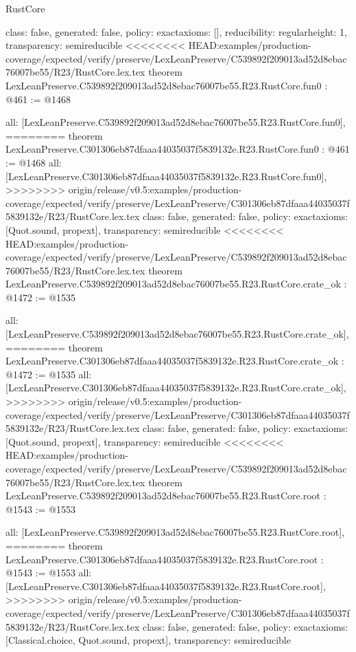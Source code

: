 \begin{lexlean}{RustCore}
\begin{coremodule}
{\begin{coremodule}
{{{  class: false,
  generated: false,
  policy: exact{axioms: []},
  reducibility: regular{height: 1},
  transparency: semireducible
}
<<<<<<<< HEAD:examples/production-coverage/expected/verify/preserve/LexLeanPreserve/C539892f209013ad52d8ebac76007be55/R23/RustCore.lex.tex
theorem LexLeanPreserve.C539892f209013ad52d8ebac76007be55.R23.RustCore.fun0 : @461 := @1468 {
  all: [LexLeanPreserve.C539892f209013ad52d8ebac76007be55.R23.RustCore.fun0],
========
theorem LexLeanPreserve.C301306eb87dfaaa44035037f5839132e.R23.RustCore.fun0 : @461 := @1468 {
  all: [LexLeanPreserve.C301306eb87dfaaa44035037f5839132e.R23.RustCore.fun0],
>>>>>>>> origin/release/v0.5:examples/production-coverage/expected/verify/preserve/LexLeanPreserve/C301306eb87dfaaa44035037f5839132e/R23/RustCore.lex.tex
  class: false,
  generated: false,
  policy: exact{axioms: [Quot.sound, propext]},
  transparency: semireducible
}
<<<<<<<< HEAD:examples/production-coverage/expected/verify/preserve/LexLeanPreserve/C539892f209013ad52d8ebac76007be55/R23/RustCore.lex.tex
theorem LexLeanPreserve.C539892f209013ad52d8ebac76007be55.R23.RustCore.crate_ok : @1472 := @1535 {
  all: [LexLeanPreserve.C539892f209013ad52d8ebac76007be55.R23.RustCore.crate_ok],
========
theorem LexLeanPreserve.C301306eb87dfaaa44035037f5839132e.R23.RustCore.crate_ok : @1472 := @1535 {
  all: [LexLeanPreserve.C301306eb87dfaaa44035037f5839132e.R23.RustCore.crate_ok],
>>>>>>>> origin/release/v0.5:examples/production-coverage/expected/verify/preserve/LexLeanPreserve/C301306eb87dfaaa44035037f5839132e/R23/RustCore.lex.tex
  class: false,
  generated: false,
  policy: exact{axioms: [Quot.sound, propext]},
  transparency: semireducible
}
<<<<<<<< HEAD:examples/production-coverage/expected/verify/preserve/LexLeanPreserve/C539892f209013ad52d8ebac76007be55/R23/RustCore.lex.tex
theorem LexLeanPreserve.C539892f209013ad52d8ebac76007be55.R23.RustCore.root : @1543 := @1553 {
  all: [LexLeanPreserve.C539892f209013ad52d8ebac76007be55.R23.RustCore.root],
========
theorem LexLeanPreserve.C301306eb87dfaaa44035037f5839132e.R23.RustCore.root : @1543 := @1553 {
  all: [LexLeanPreserve.C301306eb87dfaaa44035037f5839132e.R23.RustCore.root],
>>>>>>>> origin/release/v0.5:examples/production-coverage/expected/verify/preserve/LexLeanPreserve/C301306eb87dfaaa44035037f5839132e/R23/RustCore.lex.tex
  class: false,
  generated: false,
  policy: exact{axioms: [Classical.choice, Quot.sound, propext]},
  transparency: semireducible
}

}}}}}
\end{coremodule}}
\end{coremodule}
\end{lexlean}
